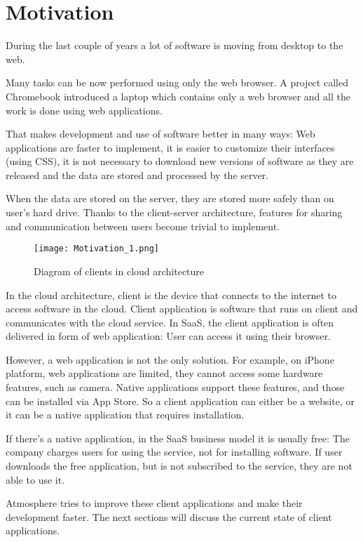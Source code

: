 \section{Motivation}

During the last couple of years a lot of software is moving from desktop to the web.

Many tasks can be now performed using only the web browser. A project called Chromebook \citep{chromebook} introduced a laptop which contains only a web browser and all the work is done using web applications.

That makes development and use of software better in many ways: Web applications are faster to implement, it is easier to customize their interfaces (using CSS), it is not necessary to download new versions of software as they are released and the data are stored and processed by the server.

When the data are stored on the server, they are stored more safely than on user's hard drive. Thanks to the client-server architecture, features for sharing and communication between users become trivial to implement.

\begin{figure}[ht!]
\centering
\texttt{[image: Motivation\_1.png]}
\caption{Diagram of clients in cloud architecture \label{fig:1}}
\end{figure}

In the cloud architecture, client is the device that connects to the internet to access software in the cloud. Client application is software that runs on client and communicates with the cloud service. In SaaS, the client application is often delivered in form of web application: User can access it using their browser.

However, a web application is not the only solution. For example, on iPhone platform, web applications are limited, they cannot access some hardware features, such as camera. Native applications support these features, and those can be installed via App Store. So a client application can either be a website, or it can be a native application that requires installation.

If there's a native application, in the SaaS business model it is usually free: The company charges users for using the service, not for installing software. If user downloads the free application, but is not subscribed to the service, they are not able to use it.

Atmosphere tries to improve these client applications and make their development faster. The next sections will discuss the current state of client applications.

